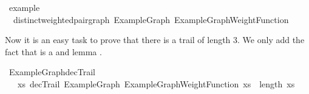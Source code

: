 \begin{isabellebody}
\begin{isamarkuptext}
\end{isamarkuptext}\isamarkuptrue%
\isamarkupfalse%
\ example{\isacharcolon}\ \isanewline
\ \ distinct{\isacharunderscore}weighted{\isacharunderscore}pair{\isacharunderscore}graph\ ExampleGraph\ ExampleGraphWeightFunction%
\isadelimproof
%
\endisadelimproof
%
\isatagproof
%
\endisatagproof
{\isafoldproof}%
%
\isadelimproof
%
\endisadelimproof
%
\begin{isamarkuptext}%
Now it is an easy task to prove that there is a trail of length 3. We only add the fact that
 is a  and lemma .%
\end{isamarkuptext}\isamarkuptrue%
\isamarkupfalse%
\ ExampleGraph{\isacharunderscore}decTrail{\isacharcolon}\isanewline
\ \ {\isachardoublequoteopen}{\isasymexists}\ xs{\isachardot}\ decTrail\ ExampleGraph\ ExampleGraphWeightFunction\ xs\ {\isasymand}\ length\ xs\ {\isacharequal}\ {}{\isachardoublequoteclose}%
\isadelimproof
%
\endisadelimproof
%
\isatagproof
%
\endisatagproof
{\isafoldproof}%
%
\isadelimproof
%
\endisadelimproof
%
\isadelimtheory
%
\endisadelimtheory
%
\isatagtheory
%
\endisatagtheory
{\isafoldtheory}%
%
\isadelimtheory
%
\endisadelimtheory
%
\end{isabellebody}%
\endinput
